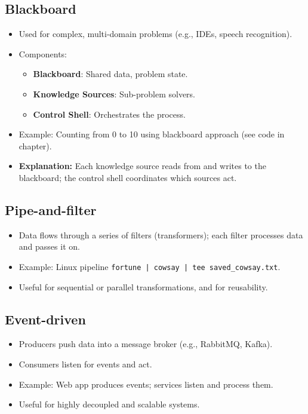 \documentclass[11pt,a4paper]{article}
\begin{document}
\subsection*{Blackboard}
\begin{itemize}
    \item Used for complex, multi-domain problems (e.g., IDEs, speech recognition).
    \item Components:
        \begin{itemize}
            \item \textbf{Blackboard}: Shared data, problem state.
            \item \textbf{Knowledge Sources}: Sub-problem solvers.
            \item \textbf{Control Shell}: Orchestrates the process.
        \end{itemize}
    \item Example: Counting from 0 to 10 using blackboard approach (see code in chapter).
    \item \textbf{Explanation:} Each knowledge source reads from and writes to the blackboard; the control shell coordinates which sources act.
\end{itemize}

\subsection*{Pipe-and-filter}
\begin{itemize}
    \item Data flows through a series of filters (transformers); each filter processes data and passes it on.
    \item Example: Linux pipeline \texttt{fortune | cowsay | tee saved\_cowsay.txt}.
    \item Useful for sequential or parallel transformations, and for reusability.
\end{itemize}

\subsection*{Event-driven}
\begin{itemize}
    \item Producers push data into a message broker (e.g., RabbitMQ, Kafka).
    \item Consumers listen for events and act.
    \item Example: Web app produces events; services listen and process them.
    \item Useful for highly decoupled and scalable systems.
\end{itemize}
\end{document}
